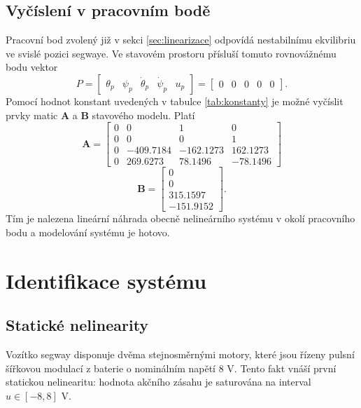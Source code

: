 \documentclass[conference]{IEEEtran}
\begin{document}
\subsection{Vyčíslení v pracovním bodě}

Pracovní bod zvolený již v sekci \ref{sec:linearizace} odpovídá nestabilnímu ekvilibriu ve svislé pozici segwaye.
Ve stavovém prostoru přísluší tomuto rovnovážnému bodu vektor 
\begin{equation}
    P = \begin{bmatrix}
        \theta_p &    \psi_p &     \dot{\theta}_p &     \dot{\psi}_p & u_p
    \end{bmatrix} = \begin{bmatrix}
        0 & 0 & 0 & 0 & 0
    \end{bmatrix}.
\end{equation}
Pomocí hodnot konstant uvedených v tabulce \ref{tab:konstanty} je možné vyčíslit prvky matic $\mathbf{A}$ a $\mathbf{B}$ stavového modelu. Platí
\begin{equation}
        \mathbf{A} = \begin{bmatrix}
            0 & 0 & 1 & 0 \\
            0 & 0 & 0 & 1 \\
            0 & -409.7184 & -162.1273 & 162.1273 \\
            0 & 269.6273 & 78.1496 & -78.1496
        \end{bmatrix}
    \end{equation}
    \begin{equation}
        \mathbf{B} = \begin{bmatrix}
            0 \\ 0 \\ 315.1597 \\ -151.9152
        \end{bmatrix}.
    \end{equation}
Tím je nalezena lineární náhrada obecně nelineárního systému v okolí pracovního bodu a modelování systému je hotovo.

\section{Identifikace systému}

\subsection{Statické nelinearity}
Vozítko segway disponuje dvěma stejnosměrnými motory, které jsou řízeny pulsní šířkovou
modulací z baterie o nominálním napětí 8 \si{V}. Tento fakt vnáší první statickou nelinearitu:
hodnota akčního zásahu je saturována na interval $u \in [-8, 8]$ \si{V}.
\end{document}
